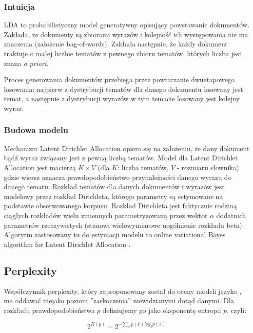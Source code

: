 \documentclass[11pt,a4paper]{article}
\begin{document}
\subsubsection{Intuicja}

LDA to probabilistyczny model generatywny opisujący powstawanie dokumentów.
Zakłada, że dokumenty są zbiorami wyrazów i kolejność ich występowania nie ma
znaczenia (założenie bag-of-words). Zakłada następnie, że każdy dokument
traktuje o małej liczbie tematów z pewnego zbioru tematów, których liczba jest
znana \emph{a priori}.

Proces generowania dokumentów przebiega przez powtarzanie dwuetapowego
losowania: najpierw z dystrybucji tematów dla danego dokumentu losowany jest
temat, a następnie z dystrybucji wyrazów w tym temacie losowany jest kolejny
wyraz.

\subsubsection{Budowa modelu}

Mechanizm Latent Dirichlet Allocation opiera się na założeniu, że dany dokument
bądź wyraz związany jest z pewną liczbą tematów.  Model dla Latent Dirichlet
Allocation jest macierzą $K \times V$ (dla $K$: liczba tematów, $V$ -
rozmiaru słownika) gdzie wiersz oznacza prawdopodobieństwo  przynależności
danego wyrazu do danego tematu.  Rozkład tematów dla danych dokumentów i
wyrazów jest modelowy przez rozkład Dirichleta, którego parametry są estymowane
na podstawie obserwowanego korpusu. Rozkład Dirichleta jest faktycznie rodziną
ciągłych rozkładów wielu zmiennych parametryzowaną przez wektor $\alpha$
dodatnich parametrów rzeczywistych (stanowi wielowymiarowe uogólnienie rozkładu
beta).  Algorytm zastosowany tu do estymacji modelu to online variational Bayes
algorithm for Latent Dirichlet Allocation \cite{gensim-algorithm}.

\subsection{Perplexity}

Współczynnik perplexity, który zaproponowany został do oceny modeli języka
\cite{bahl-perplexity}, ma oddawać niejako poziom ''zaskoczenia'' niewidzianymi
dotąd danymi. Dla rozkładu prawdopodobieństwa $p$ definiujemy go jako
eksponentę entropii $p$, czyli:

\begin{equation}
  \label{perplexity-definition}
  2^{H(p)} = 2^{-\sum_x p(x)log_2 p(x)}
\end{equation}
\end{document}
